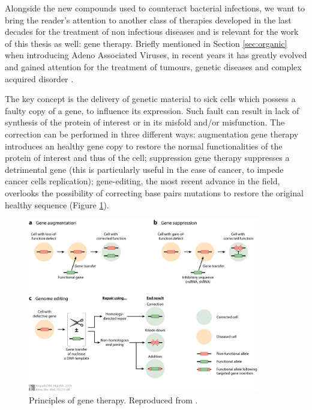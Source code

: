 
Alongside the new compounds used to counteract bacterial infections, we want to bring the reader's attention to another class of therapies developed in the last decades for the treatment of non infectious diseases and is relevant for the work of this thesis as well: gene therapy. Briefly mentioned in Section \ref{sec:organic} when introducing Adeno Associated Viruses, in recent years it has greatly evolved and gained attention for the treatment of tumours, genetic diseases and complex acquired disorder \cite{Anguela2019}.

The key concept is the delivery of genetic material to sick cells which possess a faulty copy of a gene, to influence its expression. Such fault can result in lack of synthesis of the protein of interest or in its misfold and/or misfunction. The correction can be performed in three different ways: augmentation gene therapy introduces an healthy gene copy to restore the normal functionalities of the protein of interest and thus of the cell; suppression gene therapy suppresses a detrimental gene (this is particularly useful in the case of cancer, to impede cancer cells replication); gene-editing, the most recent advance in the field, overlooks the possibility of correcting base pairs mutations to restore the original healthy sequence (Figure \ref{fig:gene_therapy}).

\begin{figure}
\begin{center}
\includegraphics[width = 0.9\textwidth]{pics/gene_therapy.jpeg}
\caption[Principles of gene therapy]{Principles of gene therapy. Reproduced from \cite{Anguela2019}.} \label{fig:gene_therapy}
\end{center}
\end{figure}

